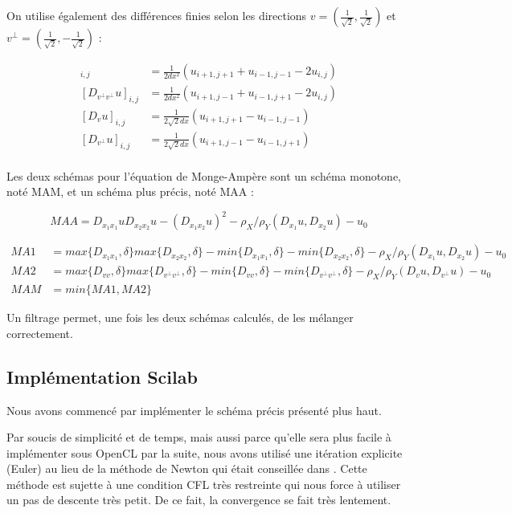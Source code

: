 \documentclass[12pt,a4paper,twoside]{article}
\begin{document}
On utilise également des différences finies selon les directions $v = (\frac{1}{\sqrt{2}},\frac{1}{\sqrt{2}})$
et $v^{\perp} = (\frac{1}{\sqrt{2}},-\frac{1}{\sqrt{2}})$ :

\begin{align*}
[D_{v v }u]_{i,j} &= \frac{1}{2dx^2} (u_{i+1,j+1} + u_{i-1,j-1}  - 2u_{i,j}) \\
[D_{v^{\perp} v^{\perp} }u]_{i,j} &= \frac{1}{2dx^2} (u_{i+1,j-1} + u_{i-1,j+1}  - 2u_{i,j}) \\
[D_{v}u]_{i,j} &= \frac{1}{2\sqrt{2}dx} (u_{i+1,j+1} - u_{i-1,j-1} )\\
[D_{v^{\perp} }u]_{i,j} &= \frac{1}{2\sqrt{2}dx} (u_{i+1,j-1} - u_{i-1,j+1} ) \\
\end{align*}




Les deux schémas pour l'équation de Monge-Ampère sont un schéma monotone, noté MAM, et un schéma plus précis, noté MAA : 

\begin{equation}
MAA = D_{x_1 x_1}uD_{x_2 x_2}u - (D_{x_1 x_2}u)^2 - \rho_X / \rho_Y (D_{x_1}u,D_{x_2}u) - u_0
\end{equation}

\begin{align*}
MA1 &= max\lbrace  D_{x_1 x_1}, \delta \rbrace max\lbrace  D_{x_2 x_2}, \delta \rbrace -
min\lbrace  D_{x_1 x_1}, \delta \rbrace - min\lbrace  D_{x_2 x_2}, \delta \rbrace - \rho_X / \rho_Y (D_{x_1}u,D_{x_2}u) - u_0 \\
MA2 &= max\lbrace  D_{v v}, \delta \rbrace max\lbrace  D_{v^{\perp} v^{\perp}}, \delta \rbrace -
min\lbrace  D_{v v}, \delta \rbrace - min\lbrace  D_{v^{\perp} v^{\perp} }, \delta \rbrace - \rho_X / \rho_Y (D_{v}u,D_{v^{\perp}}u) - u_0 \\
MAM &= min \lbrace MA1, MA2 \rbrace
\end{align*}

Un filtrage permet, une fois les deux schémas calculés, de les mélanger correctement.

\subsection{Implémentation Scilab}
Nous avons
commencé par implémenter le schéma précis
présenté plus haut.

Par soucis de simplicité et de temps, mais aussi parce qu'elle sera plus facile à implémenter sous OpenCL par la
suite,  nous avons utilisé une itération explicite (Euler) au lieu de la méthode de Newton qui était conseillée dans \cite{benamou2014numerical}. Cette méthode est sujette à une condition CFL très restreinte
qui nous force à utiliser un pas de descente très petit. De ce fait, la convergence se fait très lentement.
\end{document}
